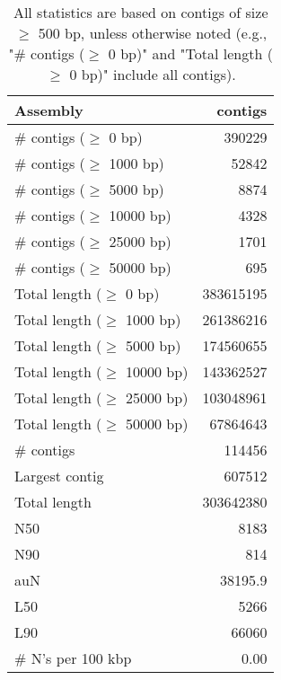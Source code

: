 \documentclass[12pt,a4paper]{article}
\begin{document}
\begin{table}[ht]
\begin{center}
\caption{All statistics are based on contigs of size $\geq$ 500 bp, unless otherwise noted (e.g., "\# contigs ($\geq$ 0 bp)" and "Total length ($\geq$ 0 bp)" include all contigs).}
\begin{tabular}{|l*{1}{|r}|}
\hline
Assembly & contigs \\ \hline
\# contigs ($\geq$ 0 bp) & 390229 \\ \hline
\# contigs ($\geq$ 1000 bp) & 52842 \\ \hline
\# contigs ($\geq$ 5000 bp) & 8874 \\ \hline
\# contigs ($\geq$ 10000 bp) & 4328 \\ \hline
\# contigs ($\geq$ 25000 bp) & 1701 \\ \hline
\# contigs ($\geq$ 50000 bp) & 695 \\ \hline
Total length ($\geq$ 0 bp) & 383615195 \\ \hline
Total length ($\geq$ 1000 bp) & 261386216 \\ \hline
Total length ($\geq$ 5000 bp) & 174560655 \\ \hline
Total length ($\geq$ 10000 bp) & 143362527 \\ \hline
Total length ($\geq$ 25000 bp) & 103048961 \\ \hline
Total length ($\geq$ 50000 bp) & 67864643 \\ \hline
\# contigs & 114456 \\ \hline
Largest contig & 607512 \\ \hline
Total length & 303642380 \\ \hline
N50 & 8183 \\ \hline
N90 & 814 \\ \hline
auN & 38195.9 \\ \hline
L50 & 5266 \\ \hline
L90 & 66060 \\ \hline
\# N's per 100 kbp & 0.00 \\ \hline
\end{tabular}
\end{center}
\end{table}
\end{document}
